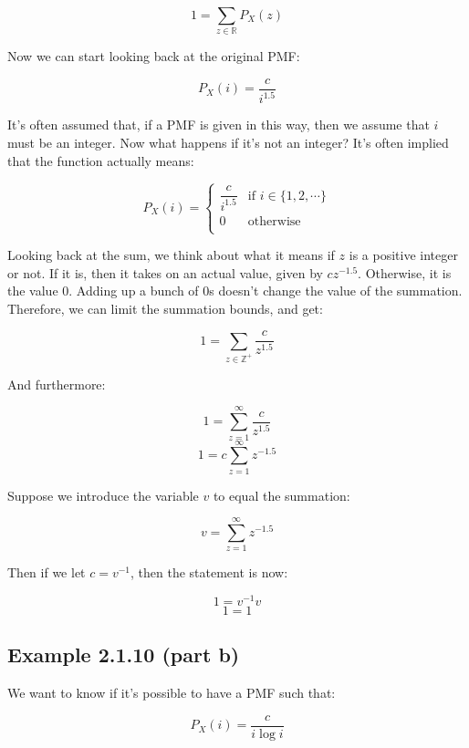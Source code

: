 \documentclass{article}
\begin{document}
\[
1=\sum\limits_{z\in\mathbb{R}}P_X(z)
\]

Now we can start looking back at the original PMF:

\[
P_X(i)=\frac{c}{i^{1.5}}
\]

It's often assumed that, if a PMF is given in this way, then we assume
that $i$ must be an integer. Now what happens if it's not an integer?
It's often implied that the function actually means:

\[
P_X(i)=\begin{cases}\dfrac{c}{i^{1.5}} & \text{if $i\in\{1,2,\cdots\}$} \\ 0 & \text{otherwise} \\\end{cases}
\]

Looking back at the sum, we think about what it means if $z$ is a
positive integer or not. If it is, then it takes on an actual value,
given by $cz^{-1.5}$. Otherwise, it is the value $0$. Adding up a
bunch of $0$s doesn't change the value of the summation. Therefore, we
can limit the summation bounds, and get:

\[
1=\sum\limits_{z\in\mathbb{Z}^+}\frac{c}{z^{1.5}}
\]

And furthermore:

\[
1=\sum\limits_{z=1}^\infty \frac{c}{z^{1.5}}
\] \[
1=c\sum\limits_{z=1}^\infty z^{-1.5}
\]

Suppose we introduce the variable $v$ to equal the summation:

\[
v=\sum\limits_{z=1}^\infty z^{-1.5}
\]

Then if we let $c=v^{-1}$, then the statement is now:

\[
1=v^{-1}v
\] \[
1=1
\]

\subsection*{Example 2.1.10 (part b)}

We want to know if it's possible to have a PMF such that:

\[
P_X(i)=\frac{c}{i\log i}
\]
\end{document}
